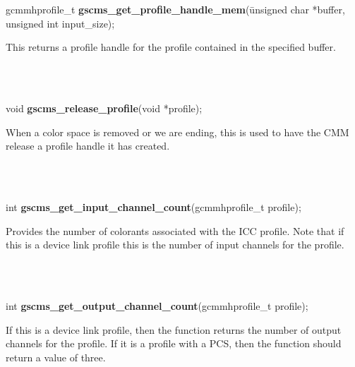 \documentclass[12pt,notitlepage]{article}
\begin{document}
\begin{tabbing}
\noindent gcmmhprofile\_t {\bf gscms\_get\_profile\_handle\_mem}(\=unsigned char *buffer, \\
\> unsigned int input\_size);\\
\end{tabbing}

\begin{minipage}[h]{6.0in}
	This returns a profile handle for the profile contained in the specified buffer.
\end{minipage}\\
\\

\begin{tabbing}
\noindent void {\bf gscms\_release\_profile}(void *profile);\\
\end{tabbing}

\begin{minipage}[h]{6.0in}
When a color space is removed or we are ending, this is used to have the CMM release a profile handle it has created.
\end{minipage}\\
\\

\begin{tabbing}
\noindent int {\bf gscms\_get\_input\_channel\_count}(gcmmhprofile\_t profile);\\
\end{tabbing}

\begin{minipage}[h]{6.0in}
Provides the number of colorants associated with the ICC profile.  Note that if this is a device link profile this is the number of input channels for the profile.
\end{minipage}\\
\\

\begin{tabbing}
\noindent int {\bf gscms\_get\_output\_channel\_count}(gcmmhprofile\_t profile);\\
\end{tabbing}

\begin{minipage}[h]{6.0in}
If this is a device link profile, then the function returns the number of output channels for the profile.  If it is a profile with a PCS, then the function should return a value of three.
\end{minipage}\\
\\
\end{document}

